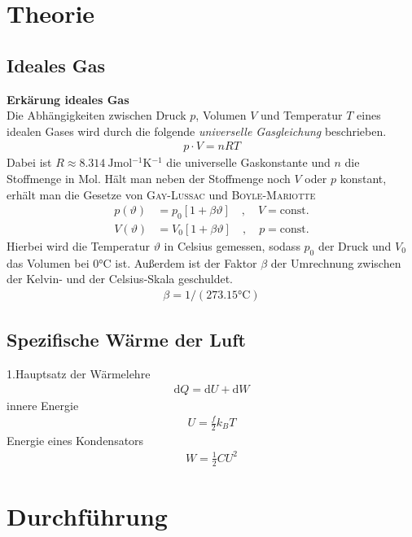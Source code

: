 \documentclass[12pt,a4paper,titlepage,headinclude,bibtotoc]{scrartcl}
\newcommand{\dif}{\ensuremath{\mathrm{d}}}
\begin{document}
\section{Theorie}
\label{sec:theorie}
\subsection{Ideales Gas}
\textbf{Erkärung ideales Gas}\\
Die Abhängigkeiten zwischen Druck $p$, Volumen $V$ und Temperatur $T$ eines idealen Gases wird durch die folgende \textit{universelle Gasgleichung} beschrieben.
\begin{align}
 p \cdot V = nRT
 \label{eq:uGasGl}
\end{align}
Dabei ist $R\approx 8.314 ~ \si{\joule \mol^{-1} \kelvin^{-1}}$ die universelle Gaskonstante und $n$ die Stoffmenge in Mol.
Hält man neben der Stoffmenge noch $V$ oder $p$ konstant, erhält man die Gesetze von \textsc{Gay-Lussac} und \textsc{Boyle-Mariotte}
\begin{align}
	p(\vartheta)&=p_0 [1+\beta\vartheta] \quad, \quad V =\text{const.}\\
	V(\vartheta)&=V_0 [1+\beta\vartheta] \quad, \quad p=\text{const.}
\end{align}
Hierbei wird die Temperatur $\vartheta$ in Celsius gemessen, sodass $p_0$ der Druck und $V_0$ das Volumen bei $0\si{\celsius}$ ist.
Außerdem ist der Faktor $\beta$ der Umrechnung zwischen der Kelvin- und der Celsius-Skala geschuldet.
\begin{align*}
	\beta=1/(273.15 \si{\celsius})
\end{align*}

\subsection{Spezifische Wärme der Luft}
1.Hauptsatz der Wärmelehre
\begin{align}
	\dif Q = \dif U+\dif W
\end{align}
innere Energie
\begin{align}
	U=\frac{f}{2} k_B T
\end{align}
Energie eines Kondensators
\begin{align}
	W=\frac{1}{2}CU^2
\end{align}

\section{Durchführung}
\label{sec:durchfuehrung}
\end{document}

